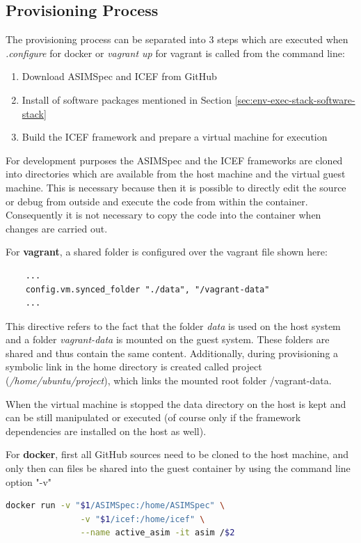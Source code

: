 \subsection{Provisioning Process}

The provisioning process can be separated into 3 steps which are executed when \textit{.\/configure} for docker or \textit{vagrant up} for vagrant is called from the command line:

\begin{enumerate}
	\item Download ASIMSpec and ICEF from GitHub
	\item Install of software packages mentioned in Section \ref{sec:env-exec-stack-software-stack}
	\item Build the ICEF framework and prepare a virtual machine for execution
\end{enumerate}

For development purposes the ASIMSpec and the ICEF frameworks are cloned into directories which are available from the host machine and the virtual guest machine. This is necessary because then it is possible to directly edit the source or debug from outside and execute the code from within the container. Consequently it is not necessary to copy the code into the container when changes are carried out.

For \textbf{vagrant}, a shared folder is configured over the vagrant file shown here:
\begin{lstlisting}
	...
	config.vm.synced_folder "./data", "/vagrant-data"
	...
\end{lstlisting}
This directive refers to the fact that the folder \textit{data} is used on the host system and a folder \textit{vagrant-data} is mounted on the guest system. These folders are shared and thus contain the same content. Additionally, during provisioning a symbolic link in the home directory is created called project (\textit{/home/ubuntu/project}), which links the mounted root folder /vagrant-data.

When the virtual machine is stopped the data directory on the host is kept and can be still manipulated or executed (of course only if the framework dependencies are installed on the host as well).

For \textbf{docker}, first all GitHub sources need to be cloned to the host machine, and only then can files be shared into the guest container by using the command line option "-v"
\begin{lstlisting}[language=bash]
	docker run -v "$1/ASIMSpec:/home/ASIMSpec" \
	           -v "$1/icef:/home/icef" \
	           --name active_asim -it asim /$2
\end{lstlisting}

